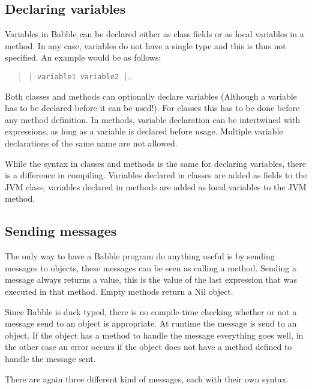 \documentclass[a4paper]{article}
\begin{document}
\subsection{Declaring variables}
Variables in Babble can be declared either as class fields or as local variables in a method. In any case, variables do not have a single type and this is thus not specified. An example would be as follows:
\begin{quote}
\begin{lstlisting}
| variable1 variable2 |.
\end{lstlisting}
\end{quote}

Both classes and methods can optionally declare variables (Although a variable has to be declared before it can be used!). For classes this has to be done before any method definition. In methods, variable declaration can be intertwined with expressions, as long as a variable is declared before usage. Multiple variable declarations of the same name are not allowed.

While the syntax in classes and methods is the same for declaring variables, there is a difference in compiling. Variables declared in classes are added as fields to the JVM class, variables declared in methods are added as local variables to the JVM method.



\subsection{Sending messages}

The only way to have a Babble program do anything useful is by sending messages to objects, these messages can be seen as calling a method. Sending a message always returns a value, this is the value of the last expression that was executed in that method. Empty methods return a Nil object.

Since Babble is duck typed, there is no compile-time checking whether or not a message send to an object is appropriate. At runtime the message is send to an object. If the object has a method to handle the message everything goes well, in the other case an error occurs if the object does not have a method defined to handle the message sent.

There are again three different kind of messages, each with their own syntax.

\end{document}
